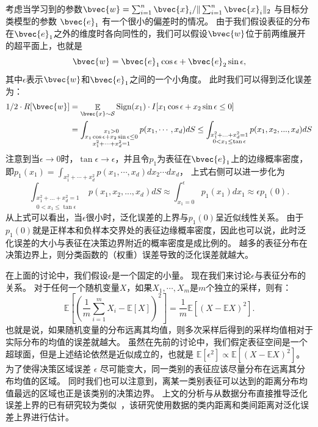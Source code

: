 考虑当学习到的参数$\bvec{w} = \sum_{i=1}^n \bvec{x}_i / \Vert \sum_{i=1}^n \bvec{x}_i \Vert_2$ 与目标分类模型的参数 $\bvec{e}_1$ 有一个很小的偏差时的情况。
%
由于我们假设表征的分布在$\bvec{e}_1$之外的维度时各向同性的，我们可以假设$\bvec{w}$位于前两维展开的超平面上，也就是
\begin{equation}
    \bvec{w} = \bvec{e}_1 \cos \epsilon + \bvec{e}_2 \sin \epsilon,    
\end{equation}
其中$\epsilon$表示$\bvec{w}$和$\bvec{e}_1$之间的一个小角度。
%
此时我们可以得到泛化误差为：
\begin{equation}
\begin{split}
    1/2\cdot R[\bvec{w}] &= \mathop{\mathbb E}_{\bvec{x} \sim \mathcal S} \text{Sign}(x_1) \cdot I[x_1 \cos \epsilon + x_2 \sin \epsilon \le 0]
    \\
    & = \int_{\substack{x_1 > 0 \\ x_1 \cos \epsilon + x_2 \sin \epsilon \le 0 \\ x_1^2 + \cdots + x_d^2 = 1}} p(x_1, \cdots, x_d)dS
      \le \int_{\substack{x_1^2 + ... + x_d^2 = 1 \\0 < x_1 \le \tan\epsilon}}p(x_1, x_2, ...,x_d)dS
\end{split}
\end{equation}
注意到当$\epsilon \to 0$时，$\tan \epsilon \to \epsilon$，并且令$p_1$为表征在$\bvec{e}_1$上的边缘概率密度，即$p_1(x_1) = \int_{x_1^2 + \cdots + x_d^2} p(x_1, \cdots, x_d) dx_2\cdots dx_d$，
%
上式右侧可以进一步化为
\begin{equation}
    \int_{\substack{x_1^2 + ... + x_d^2 = 1 \\0 < x_1 \le \tan\epsilon}}p(x_1, x_2, ...,x_d)dS \approx \int_{x_1 = 0}^{\epsilon} p_1(x_1) dx_1 \approx \epsilon p_1(0).
\end{equation}
%
从上式可以看出，当$\epsilon$很小时，泛化误差的上界与$p_1(0)$呈近似线性关系。
由于$p_1(0)$就是正样本和负样本交界处的表征边缘概率密度，因此也可以说，此时泛化误差的大小与表征在决策边界附近的概率密度是成比例的。
越多的表征分布在决策边界上，则分类函数的（权重）误差导致的泛化误差就越大。

在上面的讨论中，我们假设$\epsilon$是一个固定的小量。
%
现在我们来讨论$\epsilon$与表征分布的关系。
%
对于任何一个随机变量$X$，如果$X_1, \cdots, X_m$是$m$个独立的采样，则有：
\begin{equation}
    \mathbb E \left[ \left(\dfrac{1}{m}\sum_{i=1}^m X_i - \mathbb E[X] \right)^2 \right] = \dfrac{1}{m} \mathbb E\left[\left(X -\mathbb EX\right)^2 \right].
\end{equation}
%
也就是说，如果随机变量的分布远离其均值，则多次采样后得到的采样均值相对于实际分布的均值的误差就越大。
%
虽然在先前的讨论中，我们假定表征空间是一个超球面，但是上述结论依然是近似成立的，也就是 $\mathbb E[\epsilon^2]\propto \mathbb E\left[(X - \mathbb EX)^2\right]$。
为了使得决策区域误差 $\epsilon$ 尽可能变大，同一类别的表征应该尽量分布在远离其分布均值的区域。
同时我们也可以注意到，离某一类别表征可以达到的距离分布均值最远的区域也正是该类别的决策边界。
%
上文的分析与从数据分布直接推导泛化误差上界的已有研究较为类似~\cite{jinpengzhan2020generalization}，该研究使用数据的类内距离和类间距离对泛化误差上界进行估计。



